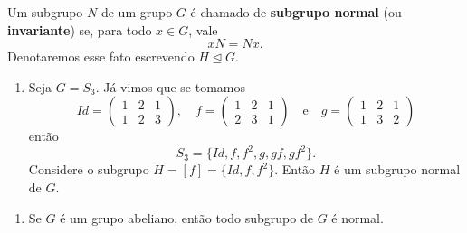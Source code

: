 \documentclass{beamer}
\begin{document}
    \begin{frame}
        \begin{definicao}
            Um subgrupo $N$ de um grupo $G$ é chamado de \textbf{subgrupo normal} (ou \textbf{invariante}) se, para todo $x \in G$, vale
            \[
                xN = Nx.
            \]
            Denotaremos esse fato escrevendo $H \unlhd G$.
        \end{definicao}
    \end{frame}

    \begin{frame}
        \begin{exemplos}
            \begin{enumerate}[label=({\arabic*})]
                \item Seja $G = S_3$. Já vimos que se tomamos
                \[
                    Id = \begin{pmatrix}
                        1 & 2 & 1\\
                        1 & 2 & 3
                    \end{pmatrix},\quad
                    f = \begin{pmatrix}
                        1 & 2 & 1\\
                        2 & 3 & 1
                    \end{pmatrix} \quad \mbox{e}\quad
                    g = \begin{pmatrix}
                        1 & 2 & 1\\
                        1 & 3 & 2
                    \end{pmatrix}
                \]
                então
                \[
                    S_3 = \{Id, f, f^2, g, gf, gf^2\}.
                \]
                Considere o subgrupo $H = [f] = \{Id, f, f^2\}$. Então $H$ é um subgrupo normal de $G$.

                \seti
            \end{enumerate}
        \end{exemplos}
    \end{frame}

    \begin{frame}
        \begin{exemplos}
            \begin{enumerate}[label=({\arabic*})]
                \conti

                \item Se $G$ é um grupo abeliano, então todo subgrupo de $G$ é normal.
                
                \seti
            \end{enumerate}
        \end{exemplos}
    \end{frame}
\end{document}
